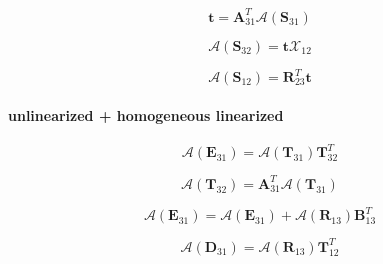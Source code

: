 \begin{equation}
\mathbf{t} = \mathbf{A}_{31}^{T}\mathcal{A}(\mathbf{S}_{31})
\label{eq:adding-upward-adjoint_of_tangent_linear-particular_linearized_particular_linearized-t}
\end{equation}

\begin{equation}
\mathcal{A}(\mathbf{S}_{32}) = \mathbf{t}\mathcal{X}_{12}
\label{eq:adding-upward-adjoint_of_tangent_linear-particular_linearized_particular_linearized-S32_a}
\end{equation}

\begin{equation}
\mathcal{A}(\mathbf{S}_{12}) = \mathbf{R}^{T}_{23}\mathbf{t}
\label{eq:adding-upward-adjoint_of_tangent_linear-particular_linearized_particular_linearized-S12_a}
\end{equation}


\paragraph{unlinearized + homogeneous linearized}
\label{sec:adding-upward-adjoint_of_tangent_linear-unlinearized_p_homogeneous_linearized}

\begin{equation}
\mathcal{A}(\mathbf{E}_{31}) = \mathcal{A}(\mathbf{T}_{31})\mathbf{T}_{32}^{T}
\label{eq:adding-upward-adjoint_of_tangent_linear-unlinearized_p_homogeneous_linearized-E13_a}
\end{equation}

\begin{equation}
\mathcal{A}(\mathbf{T}_{32}) = \mathbf{A}_{31}^{T}\mathcal{A}(\mathbf{T}_{31})
\label{eq:adding-upward-adjoint_of_tangent_linear-unlinearized_p_homogeneous_linearized-T32_a}
\end{equation}

\begin{equation}
\mathcal{A}(\mathbf{E}_{31}) = \mathcal{A}(\mathbf{E}_{31}) + \mathcal{A}(\mathbf{R}_{13})\mathbf{B}_{13}^{T}
\label{eq:adding-upward-adjoint_of_tangent_linear-unlinearized_p_homogeneous_linearized-E31_a2}
\end{equation}

\begin{equation}
\mathcal{A}(\mathbf{D}_{31}) = \mathcal{A}(\mathbf{R}_{13})\mathbf{T}_{12}^{T}
\label{eq:adding-upward-adjoint_of_tangent_linear-unlinearized_p_homogeneous_linearized-D31_a}
\end{equation}

